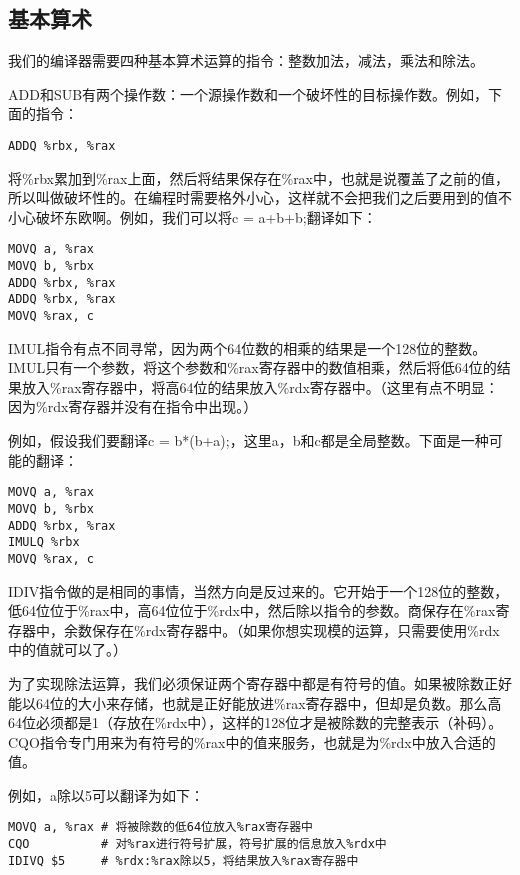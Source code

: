 \documentclass[cn,11pt,chinese]{elegantbook}
\begin{document}
\subsection{基本算术}

我们的编译器需要四种基本算术运算的指令：整数加法，减法，乘法和除法。

ADD和SUB有两个操作数：一个源操作数和一个破坏性的目标操作数。例如，下面的指令：

\begin{verbatim}
ADDQ %rbx, %rax
\end{verbatim}

将\%rbx累加到\%rax上面，然后将结果保存在\%rax中，也就是说覆盖了之前的值，所以叫做破坏性的。在编程时需要格外小心，这样就不会把我们之后要用到的值不小心破坏东欧啊。例如，我们可以将c = a+b+b;翻译如下：

\begin{verbatim}
MOVQ a, %rax
MOVQ b, %rbx
ADDQ %rbx, %rax
ADDQ %rbx, %rax
MOVQ %rax, c
\end{verbatim}

IMUL指令有点不同寻常，因为两个64位数的相乘的结果是一个128位的整数。IMUL只有一个参数，将这个参数和\%rax寄存器中的数值相乘，然后将低64位的结果放入\%rax寄存器中，将高64位的结果放入\%rdx寄存器中。（这里有点不明显：因为\%rdx寄存器并没有在指令中出现。）

例如，假设我们要翻译c = b*(b+a);，这里a，b和c都是全局整数。下面是一种可能的翻译：

\begin{verbatim}
MOVQ a, %rax
MOVQ b, %rbx
ADDQ %rbx, %rax
IMULQ %rbx
MOVQ %rax, c
\end{verbatim}

IDIV指令做的是相同的事情，当然方向是反过来的。它开始于一个128位的整数，低64位位于\%rax中，高64位位于\%rdx中，然后除以指令的参数。商保存在\%rax寄存器中，余数保存在\%rdx寄存器中。（如果你想实现模的运算，只需要使用\%rdx中的值就可以了。）

为了实现除法运算，我们必须保证两个寄存器中都是有符号的值。如果被除数正好能以64位的大小来存储，也就是正好能放进\%rax寄存器中，但却是负数。那么高64位必须都是1（存放在\%rdx中），这样的128位才是被除数的完整表示（补码）。CQO指令专门用来为有符号的\%rax中的值来服务，也就是为\%rdx中放入合适的值。

例如，a除以5可以翻译为如下：

\begin{verbatim}
MOVQ a, %rax # 将被除数的低64位放入%rax寄存器中
CQO          # 对%rax进行符号扩展，符号扩展的信息放入%rdx中
IDIVQ $5     # %rdx:%rax除以5，将结果放入%rax寄存器中
\end{verbatim}
\end{document}
